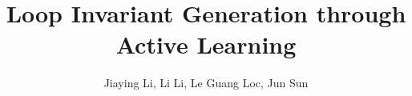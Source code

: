 \documentclass{llncs}
\begin{document}

\title{Loop Invariant Generation through Active Learning}

\author{
Jiaying Li, Li Li, Le Guang Loc, Jun Sun\\
}


\maketitle
\end{document}
